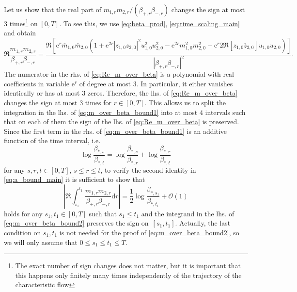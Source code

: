 \documentclass[10pt]{amsart}
\numberwithin{equation}{section}
\newcommand{\dif}{\mathrm{d}}
\newcommand{\ee}{\mathrm{e}}
\begin{document}
Let us show that the real part of $m_{1,r}m_{2,r}/(\beta_{+,r}\beta_{-,r})$ changes the sign at most 3 times\footnote{The exact number of sign changes does not matter, but it is important that this happens only finitely many times independently of the trajectory of the characteristic flow} on $[0,T]$. To see this, we use \eqref{eq:beta_prod}, \eqref{eq:time_scaling_main} and obtain
\begin{equation}
\Re \frac{m_{1,r}m_{2,r}}{\beta_{+,r}\beta_{-,r}} =  \frac{\Re \left[\ee^r \overline{m}_{1,0}\overline{m}_{2,0}\left( 1+\ee^{2r}|z_{1,0}z_{2,0}|^2 u_{1,0}^2u_{2,0}^2 - \ee^{2r} m_{1,0}^2m_{2,0}^2 -\ee^r 2\Re [z_{1,0}\overline{z}_{2,0}]u_{1,0}u_{2,0}\right)\right]}{|\beta_{+,r}\beta_{-,r}|^2}. 
\label{eq:Re_m_over_beta}
\end{equation}
The numerator in the rhs. of \eqref{eq:Re_m_over_beta} is a polynomial with real coefficients in variable $\ee^r$ of degree at most 3. In particular, it either vanishes identically or has at most 3 zeros. Therefore, the lhs. of \eqref{eq:Re_m_over_beta} changes the sign at most 3 times for $r\in [0,T]$. This allows us to split the integration in the lhs. of \eqref{eq:m_over_beta_bound1} into at most 4 intervals such that on each of them the sign of the lhs. of \eqref{eq:Re_m_over_beta} is preserved. Since the first term in the rhs. of \eqref{eq:m_over_beta_bound1} is an additive function of the time interval, i.e.
\begin{equation*}
\log \frac{\beta_{*,s}}{\beta_{*,t}}=\log\frac{\beta_{*,s}}{\beta_{*,r}} +\log \frac{\beta_{*,r}}{\beta_{*,t}}
\end{equation*}
for any $s,r,t\in [0,T]$, $s\le r\le t$, to verify the second identity in \eqref{eq:a_bound_main} it is sufficient to show that 
\begin{equation}
\left\vert\Re\int_{s_1}^{t_1} \frac{m_{1,r}m_{2,r}}{\beta_{+,r}\beta_{-,r}}\dif r\right\vert = \frac{1}{2}\log \frac{\beta_{*,s_1}}{\beta_{*,t_1}} + \mathcal{O}(1)
\label{eq:m_over_beta_bound2}
\end{equation}
holds for any $s_1,t_1\in [0,T]$ such that $s_1\le t_1$ and the integrand in the lhs. of \eqref{eq:m_over_beta_bound2} preserves the sign on~$[s_1,t_1]$. Actually, the last condition on $s_1, t_1$ is not needed for the proof of \eqref{eq:m_over_beta_bound2}, so we will only assume that $0\le s_1\le t_1\le T$.
\end{document}
